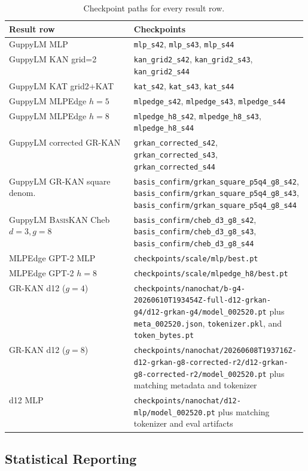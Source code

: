 \documentclass{article}
\newcommand{\grkan}{\textsc{GR-KAN}}
\newcommand{\basiskan}{\textsc{BasisKAN}}
\begin{document}
\begin{table}[h]
\centering
\small
\caption{Checkpoint paths for every result row.}
\label{tab:checkpoints}
\begin{tabular}{@{}lp{0.58\linewidth}@{}}
\toprule
Result row & Checkpoints \\
\midrule
GuppyLM MLP & \texttt{mlp\_s42}, \texttt{mlp\_s43}, \texttt{mlp\_s44} \\
GuppyLM KAN grid=2 & \texttt{kan\_grid2\_s42}, \texttt{kan\_grid2\_s43}, \texttt{kan\_grid2\_s44} \\
GuppyLM KAT grid2+KAT & \texttt{kat\_s42}, \texttt{kat\_s43}, \texttt{kat\_s44} \\
GuppyLM MLPEdge $h=5$ & \texttt{mlpedge\_s42}, \texttt{mlpedge\_s43}, \texttt{mlpedge\_s44} \\
GuppyLM MLPEdge $h=8$ & \texttt{mlpedge\_h8\_s42}, \texttt{mlpedge\_h8\_s43}, \texttt{mlpedge\_h8\_s44} \\
GuppyLM corrected GR-KAN & \texttt{grkan\_corrected\_s42}, \texttt{grkan\_corrected\_s43}, \texttt{grkan\_corrected\_s44} \\
GuppyLM \grkan{} square denom. & \texttt{basis\_confirm/grkan\_square\_p5q4\_g8\_s42}, \texttt{basis\_confirm/grkan\_square\_p5q4\_g8\_s43}, \texttt{basis\_confirm/grkan\_square\_p5q4\_g8\_s44} \\
GuppyLM \basiskan{} Cheb $d=3,g=8$ & \texttt{basis\_confirm/cheb\_d3\_g8\_s42}, \texttt{basis\_confirm/cheb\_d3\_g8\_s43}, \texttt{basis\_confirm/cheb\_d3\_g8\_s44} \\
MLPEdge GPT-2 MLP & \texttt{checkpoints/scale/mlp/best.pt} \\
MLPEdge GPT-2 $h=8$ & \texttt{checkpoints/scale/mlpedge\_h8/best.pt} \\
GR-KAN d12 ($g=4$) & \nolinkurl{checkpoints/nanochat/b-g4-20260610T193454Z-full-d12-grkan-g4/d12-grkan-g4/model_002520.pt} plus \texttt{meta\_002520.json}, \texttt{tokenizer.pkl}, and \texttt{token\_bytes.pt} \\
GR-KAN d12 ($g=8$) & \nolinkurl{checkpoints/nanochat/20260608T193716Z-d12-grkan-g8-corrected-r2/d12-grkan-g8-corrected-r2/model_002520.pt} plus matching metadata and tokenizer \\
d12 MLP & \texttt{checkpoints/nanochat/d12-mlp/model\_002520.pt} plus matching tokenizer and eval artifacts \\
\bottomrule
\end{tabular}
\end{table}

\subsection{Statistical Reporting}
\end{document}
